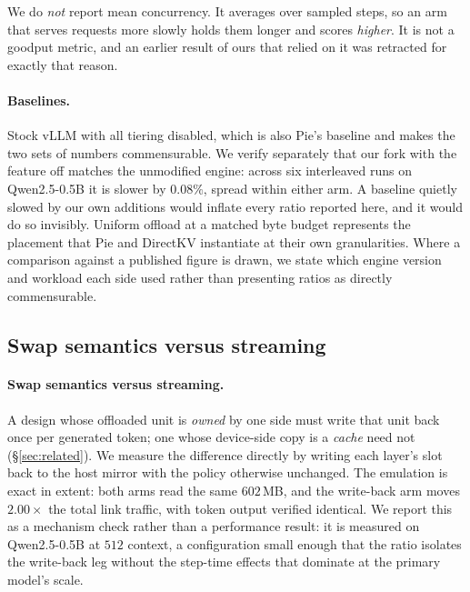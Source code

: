We do \emph{not} report mean concurrency. It averages over sampled steps, so an
arm that serves requests more slowly holds them longer and scores
\emph{higher}. It is not a goodput metric, and an earlier result of ours that
relied on it was retracted for exactly that reason.

\paragraph{Baselines.} Stock vLLM with all tiering disabled, which is also
Pie's baseline and makes the two sets of numbers commensurable. We verify separately that our fork with the feature off matches the unmodified
engine: across six interleaved runs on Qwen2.5-0.5B it is slower by $0.08\%$,
spread within either arm. A baseline quietly slowed by our own additions would
inflate every ratio reported here, and it would do so invisibly. Uniform offload at a matched byte budget represents the placement
that Pie and DirectKV instantiate at their own granularities. Where a
comparison against a published figure is drawn, we state which engine version
and workload each side used rather than presenting ratios as directly
commensurable.

\subsection*{Swap semantics versus streaming}

\paragraph{Swap semantics versus streaming.} A design whose offloaded unit is
\emph{owned} by one side must write that unit back once per generated token; one
whose device-side copy is a \emph{cache} need not (\S\ref{sec:related}). We
measure the difference directly by writing each layer's slot back to the host
mirror with the policy otherwise unchanged. The emulation is exact in extent:
both arms read the same $602$\,MB, and the write-back arm moves
\textbf{$2.00\times$} the total link traffic, with token output verified
identical. We report this as a mechanism check rather than a performance
result: it is measured on Qwen2.5-0.5B at $512$ context, a configuration small
enough that the ratio isolates the write-back leg without the step-time effects
that dominate at the primary model's scale.
